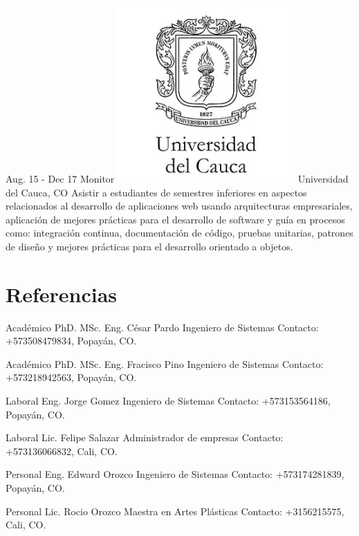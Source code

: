 \documentclass[]{cv-class}
\begin{document}
\begin{entrylist}
	\entry
	{Aug. 15 - Dec 17}
	{Monitor}
	{{\includegraphics[scale=0.05]{img/unicauca-logo.png}} Universidad del Cauca, CO} 
	{Asistir a estudiantes de semestres inferiores en aspectos relacionados al desarrollo de aplicaciones web usando arquitecturas empresariales, aplicación de mejores prácticas para el desarrollo de software y guía en procesos como: integración continua, documentación de código, pruebas unitarias, patrones de diseño y mejores prácticas para el desarrollo orientado a objetos.}
	
\end{entrylist}


\section{Referencias}
\begin{entrylist}
	  
	\entry
	{Académico}
	{PhD. MSc. Eng. César Pardo}
	{Ingeniero de Sistemas} 
	{Contacto: +573508479834, Popayán, CO.}
	
	\entry
	{Académico}
	{PhD. MSc. Eng. Fracisco Pino}
	{Ingeniero de Sistemas} 
	{Contacto: +573218942563, Popayán, CO.}
	
	\entry
	{Laboral}
	{Eng. Jorge Gomez}
	{Ingeniero de Sistemas} 
	{Contacto: +573153564186, Popayán, CO.}
	
	\entry
	{Laboral}
	{Lic. Felipe Salazar}
	{Administrador de empresas} 
	{Contacto: +573136066832, Cali, CO.}
	
	\entry
	{Personal}
	{Eng. Edward Orozco}
	{Ingeniero de Sistemas} 
	{Contacto: +573174281839, Popayán, CO.}
	
	\entry
	{Personal}
	{Lic. Rocio Orozco}
	{Maestra en Artes Plásticas} 
	{Contacto: +3156215575, Cali, CO.}
	
\end{entrylist}
\end{document}
